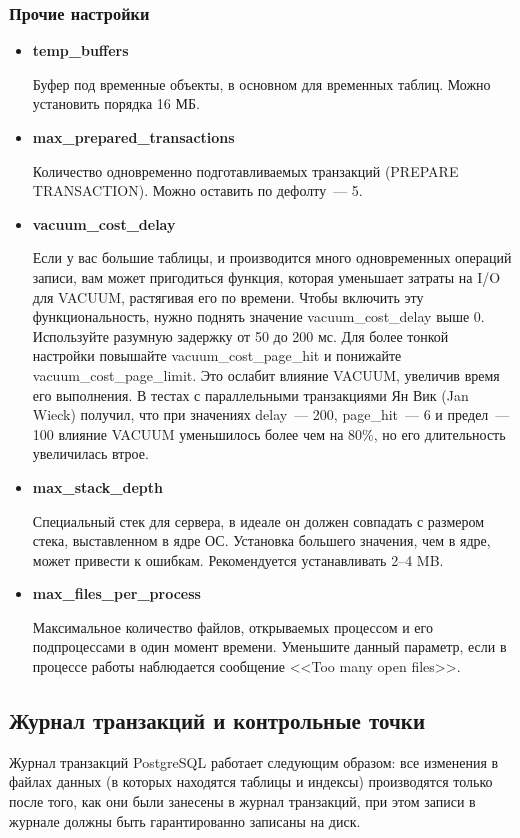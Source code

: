 \subsubsection{Прочие настройки}
\begin{itemize}
\item \textbf{temp\_buffers}

Буфер под временные объекты, в основном для временных таблиц.
Можно установить порядка 16 МБ.

\item \textbf{max\_prepared\_transactions}

Количество одновременно подготавливаемых транзакций (PREPARE TRANSACTION).
Можно оставить по дефолту~--- 5.

\item \textbf{vacuum\_cost\_delay} 

Если у вас большие таблицы, и производится много одновременных операций записи, 
вам может пригодиться функция, которая уменьшает затраты на I/O для VACUUM, растягивая его по времени. 
Чтобы включить эту функциональность, нужно поднять 
значение vacuum\_cost\_delay выше 0. Используйте разумную задержку от 50 до 200 мс. Для более тонкой настройки повышайте 
vacuum\_cost\_page\_hit и понижайте vacuum\_cost\_page\_limit. Это ослабит влияние VACUUM, увеличив время его выполнения. 
В тестах с параллельными транзакциями Ян Вик (Jan Wieck) получил, что при значениях delay~--- 200, page\_hit~--- 6 и предел~--- 
100 влияние VACUUM уменьшилось более чем на 80\%, но его длительность увеличилась втрое. 

\item \textbf{max\_stack\_depth}

Специальный стек для сервера, в идеале он должен совпадать с размером стека, выставленном в ядре ОС. 
Установка большего значения, чем в ядре, может привести к ошибкам.
Рекомендуется устанавливать 2--4 MB.

\item \textbf{max\_files\_per\_process}

Максимальное количество файлов, открываемых процессом и его подпроцессами в один момент времени.
Уменьшите данный параметр, если в процессе работы наблюдается сообщение <<Too many open files>>.
\end{itemize}


\subsection{Журнал транзакций и контрольные точки}
Журнал транзакций PostgreSQL работает следующим образом: все изменения в файлах данных (в которых находятся таблицы и 
индексы) производятся только после того, как они были занесены в журнал транзакций, при этом записи в журнале должны 
быть гарантированно записаны на диск.

